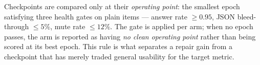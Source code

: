 Checkpoints are compared only at their \emph{operating point}: the smallest
epoch satisfying three health gates on plain items --- answer rate
$\geq 0.95$, JSON bleed-through $\leq 5\%$, mute rate $\leq 12\%$. The gate is
applied per arm; when no epoch passes, the arm is reported as having
\emph{no clean operating point} rather than being scored at its best epoch.
This rule is what separates a repair gain from a checkpoint that has merely
traded general usability for the target metric.
